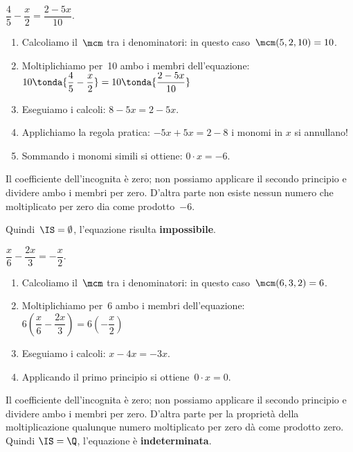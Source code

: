 \begin{esempio}{}{}
\(\dfrac{4}{5}-\dfrac{x}{2}=\dfrac{2-5x}{10}\).

\begin{enumerate} [nosep]
\item Calcoliamo il~\(\mcm\) tra i denominatori: in questo
caso~\(\mcm(5, 2, 10) = 10\).
\item Moltiplichiamo per~10 ambo i membri
dell'equazione: \\[1mm]
\(10\tonda{\dfrac{4}{5} -\dfrac{x}{2}} = 10\tonda{\dfrac{2-5x}{10}}\)
\item Eseguiamo i calcoli: \quad \(8 -5x = 2 -5x\).
\item Applichiamo la regola pratica:
\(-5x +5x = 2 -8\) i monomi in \(x\) si annullano!
\item Sommando i monomi simili si ottiene: \quad \(0 \cdot x=-6\).
\end{enumerate}

Il coefficiente dell'incognita è zero; non possiamo
applicare il secondo principio e dividere ambo i membri per zero.
D'altra parte non esiste nessun numero che moltiplicato
per zero dia come prodotto~\(-6\). 

Quindi~\(\IS =\emptyset \), l'equazione risulta \textbf{impossibile}.
\end{esempio}

\begin{esempio}{}{}
\(\dfrac{x}{6}-\dfrac{2x}{3}=-{\dfrac{x}{2}}\).

\begin{enumerate} [nosep]
\item Calcoliamo il~\(\mcm\) tra i denominatori: in questo
caso~\(\mcm(6, 3, 2) = 6\).
\item Moltiplichiamo per~6 ambo i membri
dell'equazione: \\[1mm]
\(6\left(\dfrac{x}{6}-\dfrac{2x}{3}\right)=6\left(-{\dfrac{x}{2}}\right)\)
\item Eseguiamo i calcoli: \quad \(x-4x=-3x\).
\item Applicando il primo principio si ottiene~\(0 \cdot x=0\).
\end{enumerate}

Il coefficiente dell'incognita è zero; non possiamo
applicare il secondo principio e dividere ambo i membri per zero.
D'altra parte per la proprietà della moltiplicazione
qualunque numero moltiplicato per zero dà come prodotto zero. 
Quindi \(\IS = \Q\), l'equazione è \textbf{indeterminata}.
\end{esempio}

